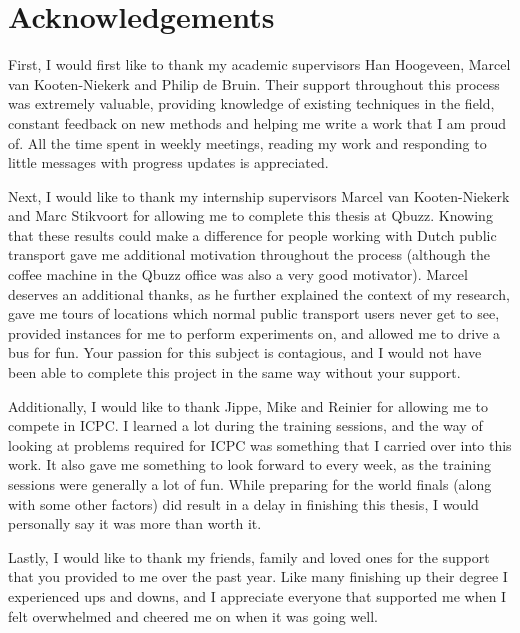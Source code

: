 \documentclass[]{article}
\begin{document}
\section*{Acknowledgements}
First, I would first like to thank my academic supervisors Han Hoogeveen, Marcel van Kooten-Niekerk and Philip de Bruin. Their support throughout this process was extremely valuable, providing knowledge of existing techniques in the field, constant feedback on new methods and helping me write a work that I am proud of. All the time spent in weekly meetings, reading my work and responding to little messages with progress updates is appreciated. 

Next, I would like to thank my internship supervisors Marcel van Kooten-Niekerk and Marc Stikvoort for allowing me to complete this thesis at Qbuzz. Knowing that these results could make a difference for people working with Dutch public transport gave me additional motivation throughout the process (although the coffee machine in the Qbuzz office was also a very good motivator). Marcel deserves an additional thanks, as he further explained the context of my research, gave me tours of locations which normal public transport users never get to see, provided instances for me to perform experiments on, and allowed me to drive a bus for fun. Your passion for this subject is contagious, and I would not have been able to complete this project in the same way without your support. 

Additionally, I would like to thank Jippe, Mike and Reinier for allowing me to compete in ICPC. I learned a lot during the training sessions, and the way of looking at problems required for ICPC was something that I carried over into this work. It also gave me something to look forward to every week, as the training sessions were generally a lot of fun. While preparing for the world finals (along with some other factors) did result in a delay in finishing this thesis, I would personally say it was more than worth it. 

Lastly, I would like to thank my friends, family and loved ones for the support that you provided to me over the past year. Like many finishing up their degree I experienced ups and downs, and I appreciate everyone that supported me when I felt overwhelmed and cheered me on when it was going well.

\newpage
\tableofcontents
\newpage
\end{document}
